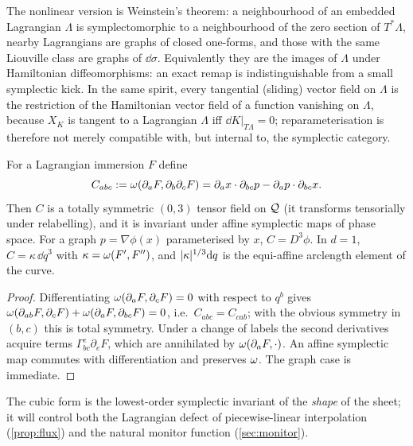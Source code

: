 The nonlinear version is Weinstein's theorem: a neighbourhood of an embedded Lagrangian $\Lambda$ is
symplectomorphic to a neighbourhood of the zero section of $T^*\Lambda$, nearby Lagrangians are graphs of closed
one-forms, and those with the same Liouville class are graphs of $\dd\sigma$. Equivalently they are the images of
$\Lambda$ under Hamiltonian diffeomorphisms: an exact remap is indistinguishable from a small symplectic kick.
In the same spirit, every tangential (sliding) vector field on $\Lambda$ is the restriction of the Hamiltonian
vector field of a function vanishing on $\Lambda$, because $X_K$ is tangent to a Lagrangian $\Lambda$ iff
$\dd K|_{T\Lambda}=0$; reparameterisation is therefore not merely compatible with, but internal to, the symplectic category.

\begin{proposition}\label{prop:cubic}
For a Lagrangian immersion $F$ define
\begin{equation}\label{eq:cubic}
C_{abc}:=\omega(\partial_aF,\partial_b\partial_cF)=\partial_ax\cdot\partial_{bc}p-\partial_ap\cdot\partial_{bc}x .
\end{equation}
Then $C$ is a totally symmetric $(0,3)$ tensor field on $\mathcal{Q}$ (it transforms tensorially under relabelling), and it
is invariant under affine symplectic maps of phase space. For a graph $p=\nabla\phi(x)$ parameterised by $x$,
$C=D^3\phi$. In $d=1$, $C=\kappa\,\dd q^3$ with $\kappa=\omega(F',F'')$, and $\lvert \kappa\rvert^{1/3}\mathrm{d} q$ is the
equi-affine arclength element of the curve.
\end{proposition}
\begin{proof}
Differentiating $\omega(\partial_aF,\partial_cF)=0$ with respect to $q^b$ gives
$\omega(\partial_{ab}F,\partial_cF)+\omega(\partial_aF,\partial_{bc}F)=0$, i.e.\ $C_{abc}=C_{cab}$; with the obvious symmetry in
$(b,c)$ this is total symmetry. Under a change of labels the second derivatives acquire terms
$\Gamma^e_{bc}\partial_eF$, which are annihilated by $\omega(\partial_aF,\cdot)$. An affine symplectic map commutes with
differentiation and preserves $\omega$. The graph case is immediate.
\end{proof}

The cubic form is the lowest-order symplectic invariant of the \emph{shape} of the sheet; it will control both the
Lagrangian defect of piecewise-linear interpolation (\cref{prop:flux}) and the natural monitor function (\cref{sec:monitor}).
